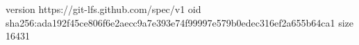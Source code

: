 version https://git-lfs.github.com/spec/v1
oid sha256:ada192f45ce806f6e2aecc9a7e393e74f99997e579b0edec316ef2a655b64ca1
size 16431
